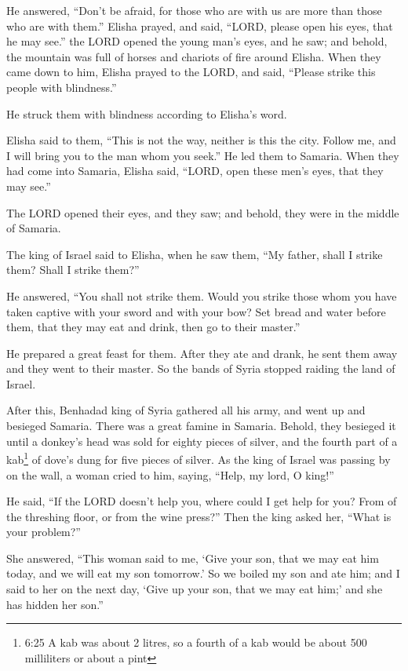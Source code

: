  He answered, ``Don't be afraid, for those who are with us
are more than those who are with them.''  Elisha prayed,
and said, ``LORD, please open his eyes, that he may see.'' the LORD
opened the young man's eyes, and he saw; and behold, the mountain was
full of horses and chariots of fire around Elisha.  When
they came down to him, Elisha prayed to the LORD, and said, ``Please
strike this people with blindness.''

He struck them with blindness according to Elisha's word.

 Elisha said to them, ``This is not the way, neither is
this the city. Follow me, and I will bring you to the man whom you
seek.'' He led them to Samaria.  When they had come into
Samaria, Elisha said, ``LORD, open these men's eyes, that they may
see.''

The LORD opened their eyes, and they saw; and behold, they were in the
middle of Samaria.

 The king of Israel said to Elisha, when he saw them, ``My
father, shall I strike them? Shall I strike them?''

 He answered, ``You shall not strike them. Would you strike
those whom you have taken captive with your sword and with your bow? Set
bread and water before them, that they may eat and drink, then go to
their master.''

 He prepared a great feast for them. After they ate and
drank, he sent them away and they went to their master. So the bands of
Syria stopped raiding the land of Israel.

 After this, Benhadad king of Syria gathered all his army,
and went up and besieged Samaria.  There was a great famine
in Samaria. Behold, they besieged it until a donkey's head was sold for
eighty pieces of silver, and the fourth part of a kab\footnote{6:25 A
  kab was about 2 litres, so a fourth of a kab would be about 500
  milliliters or about a pint} of dove's dung for five pieces of silver.
 As the king of Israel was passing by on the wall, a woman
cried to him, saying, ``Help, my lord, O king!''

 He said, ``If the LORD doesn't help you, where could I get
help for you? From of the threshing floor, or from the wine press?''
 Then the king asked her, ``What is your problem?''

She answered, ``This woman said to me, `Give your son, that we may eat
him today, and we will eat my son tomorrow.'  So we boiled
my son and ate him; and I said to her on the next day, `Give up your
son, that we may eat him;' and she has hidden her son.''

